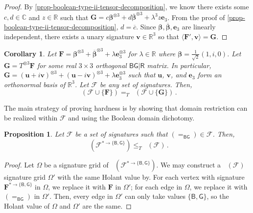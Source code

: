 \documentclass[11pt]{article}
\newtheorem{corollary}[theorem]{Corollary}
\newtheorem{proposition}[theorem]{Proposition}
\DeclareMathOperator{\holbs}{Holant^*_2}
\DeclareMathOperator{\holts}{Holant^*_3}
\newcommand{\db}{\mathsf{B}}
\newcommand{\dg}{\mathsf{G}}
\newcommand{\dr}{\mathsf{R}}
\newcommand{\teh}{^{\otimes 3}}
\newcommand{\domres}[1]{
  ^{*\to\{#1\}}
}
\begin{document}
\begin{proof}
  By \cref{prop-boolean-type-ii-tensor-decomposition}, we know there exists some $c, d \in \mathbb{C}$ and $z \in \mathbb{R}$ such that $\mathbf{G} = c \boldsymbol{\beta} \teh + d \overline{\boldsymbol{\beta}}\teh + \lambda^3 z \mathbf{e}_3$. From the proof of \cref{prop-boolean-type-ii-tensor-decomposition}, $d = \overline{c}$.
  Since $\boldsymbol{\beta}, \overline{\boldsymbol{\beta}}, \mathbf{e}_3$ are linearly independent,
  there exists a unary signature $\mathbf{v} \in \mathbb{R}^3$ so that 
  $\langle \mathbf{F}', \mathbf{v} \rangle = \mathbf{G}$.

\end{proof}

\begin{corollary}\label{cor:z-normalization-orthogonal}
Let $\mathbf{F} = \boldsymbol{\beta} \teh + \overline{\boldsymbol{\beta}} \teh + \lambda \mathbf{e}_3 \teh$ for $\lambda \in \mathbb{R}$ where $\boldsymbol{\beta} = \frac{1}{\sqrt{2}} (1, i, 0)$.
  Let $\mathbf{G} = T \teh \mathbf{F}$ for some real $3 \times 3$ orthogonal $\db \dg | \dr$ matrix.
  In particular, $\mathbf{G} = (\mathbf{u} + i \mathbf{v})\teh + (\mathbf{u} - i \mathbf{v})\teh + \lambda \mathbf{e}_3\teh$ such that $\mathbf{u}$, $\mathbf{v}$, and $\mathbf{e}_3$ form an orthonormal basis of $\mathbb{R}^3$.
  Let $\mathcal{F}$ be any set of signatures. Then,
  \[
    \holts(\mathcal{F} \cup \{\mathbf{F}\}) =_T \holts(\mathcal{F} \cup \{\mathbf{G}\}) \, .
  \]
\end{corollary}

The main strategy of proving hardness is by showing that domain restriction can be realized within $\mathcal{F}$ and using the Boolean domain dichotomy.
\begin{proposition}\label{lem:domain-restriction}
  Let $\mathcal{F}$ be a set of signatures such that $(=_{\db \dg}) \in \mathcal{F}$.
  Then,
  \[
    \holbs(\mathcal{F}\domres{\db, \dg}) \le_T \holts(\mathcal{F}) \, .
  \]
\end{proposition}
\begin{proof}
  Let $\Omega$ be a signature grid of $\holbs(\mathcal{F}\domres{\db, \dg}) $.
  We may construct a $\holts(\mathcal{F})$ signature grid $\Omega'$ with the same Holant value by.
  For each vertex with signature $\mathbf{F}\domres{\db, \dg}$ in $\Omega$, we replace it with $\mathbf{F}$ in $\Omega'$;
  for each edge in $\Omega$, we replace it with $(=_{\db \dg})$ in $\Omega'$.
  Then, every edge in $\Omega'$ can only take values $\{\db, \dg\}$, so the Holant value of $\Omega$ and $\Omega'$ are the same.
\end{proof}
\end{document}
